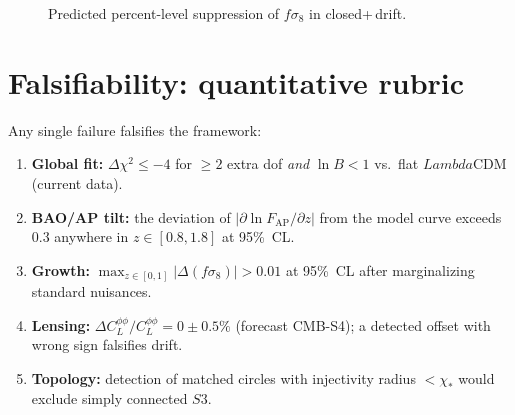 \documentclass[twocolumn,aps,prd,showpacs,nofootinbib,superscriptaddress]{revtex4-2}
\def\Sthree{S3}%
\def\Lambda{Lambda}%
\newcommand{\Sthree}{S^{3}}
\newcommand{\chis}{\chi_{\ast}} %
\newcommand{\ap}{\mathrm{AP}}
\begin{document}
\begin{figure}[t]
\centering
{}
\caption{Predicted percent-level suppression of $f\sigma_8$ in closed+$\,$drift.}
\end{figure}

\section{Falsifiability: quantitative rubric}
\label{sec:falsify}
Any single failure falsifies the framework:
\begin{enumerate}
\item \textbf{Global fit:} $\Delta\chi^2 \le -4$ for $\ge 2$ extra dof \emph{and} $\ln B<1$ vs.\ flat $\Lambda$CDM (current data).
\item \textbf{BAO/AP tilt:} the deviation of $|\partial\ln F_{\ap}/\partial z|$ from the model curve exceeds $0.3$ anywhere in $z\!\in\![0.8,1.8]$ at 95\%~CL.
\item \textbf{Growth:} $\max_{z\in[0,1]}|\Delta(f\sigma_8)|>0.01$ at 95\%~CL after marginalizing standard nuisances.
\item \textbf{Lensing:} $\Delta C_L^{\phi\phi}/C_L^{\phi\phi}=0\pm0.5\%$ (forecast CMB-S4); a detected offset with wrong sign falsifies drift.
\item \textbf{Topology:} detection of matched circles with injectivity radius $<\chis$ would exclude simply connected $\Sthree$.
\end{enumerate}
\end{document}
